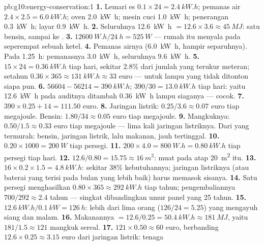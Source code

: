 \begin{solution}{pb:g10:energy-conservation:1}
\textbf{1.} Lemari es $0.1 \times 24 = \qty{2.4}{kW.h}$; pemanas air
$2.4 \times 2.5 = \qty{6.0}{kW.h}$; oven \qty{2.0}{kW.h}; mesin cuci
\qty{1.0}{kW.h}; penerangan \qty{0.3}{kW.h}; layar \qty{0.9}{kW.h}.
\textbf{2.} Seluruhnya \qty{12.6}{kW.h} $= 12.6 \times 3.6 \approx
\qty{45}{MJ}$: satu  bensin, sampai ke .
\textbf{3.} $\qty{12600}{W.h}/\qty{24}{h} = \qty{525}{W}$ --- rumah itu
menyala pada seperempat sebuah ketel.
\textbf{4.} Pemanas airnya (\qty{6.0}{kW.h}, hampir separuhnya). Pada
\qty{1.25}{h}: pemanasnya \qty{3.0}{kW.h}, seluruhnya \qty{9.6}{kW.h}.
\textbf{5.} $15 \times 24 = \qty{0.36}{kW.h}$ tiap hari, sekitar
$2.8\%$ dari jumlah yang terukur meteran; setahun
$0.36 \times 365 \approx
\qty{131}{kW.h} \approx 33$ euro --- untuk
lampu yang tidak ditonton siapa pun.
\textbf{6.} $56604 - 56214 = \qty{390}{kW.h}$;
$390/30 = \qty{13.0}{kW.h}$ tiap hari: yaitu \qty{12.6}{kW.h} pada
auditnya ditambah \qty{0.36}{kW.h} lampu siaganya --- cocok.
\textbf{7.} $390 \times 0.25 + 14 = 111.50$ euro.
\textbf{8.} Jaringan listrik: $0.25/3.6 \approx 0.07$ euro tiap
megajoule. Bensin: $1.80/34 \approx 0.05$ euro tiap megajoule.
\textbf{9.} Mangkuknya: $0.50/1.5 \approx 0.33$ euro tiap megajoule ---
lima kali jaringan listriknya. Dari yang termurah: bensin, jaringan
listrik, lalu makanan, jauh tertinggal.
\textbf{10.} $0.20 \times 1000 = \qty{200}{W}$ tiap  persegi.
\textbf{11.} $200 \times 4.0 = \qty{800}{W.h} = \qty{0.80}{kW.h}$ tiap
 persegi tiap hari.
\textbf{12.} $12.6/0.80 = 15.75 \approx \qty{16}{m^2}$: muat pada atap
\qty{20}{m^2} itu.
\textbf{13.} $16 \times 0.2 \times 1.5 = \qty{4.8}{kW.h}$: sekitar
$38\%$ kebutuhannya; jaringan listriknya (atau baterai yang terisi pada
bulan yang lebih baik) harus memasok sisanya.
\textbf{14.} Satu  persegi menghasilkan $0.80 \times 365 \approx
\qty{292}{kW.h}$ tiap tahun; pengembaliannya $700/292 \approx 2.4$
tahun --- singkat dibandingkan umur panel yang 25 tahun.
\textbf{15.} $\qty{12.6}{kW.h}/\qty{0.1}{kW} = \qty{126}{h}$: lebih
dari lima orang ($126/24 = 5.25$) yang mengayuh siang dan malam.
\textbf{16.} Makanannya $= 12.6/0.25 = \qty{50.4}{kW.h} \approx
\qty{181}{MJ}$, yaitu $181/1.5 \approx 121$ mangkuk sereal.
\textbf{17.} $121 \times 0.50 \approx 60$ euro, berbanding
$12.6 \times 0.25 \approx 3.15$ euro dari jaringan listrik: tenaga

\end{solution}
